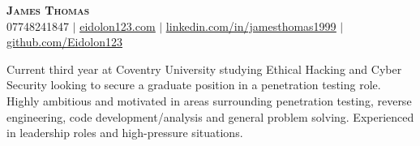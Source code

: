 \documentclass[letterpaper,11pt]{article}
\begin{document}
\linespread{1.3}


\begin{center}
    \textbf{\Huge \scshape James Thomas} \\ \vspace{1pt}
    \small 07748241847 $|$ \href{mailto:x@xcom}{\underline{eidolon123.com}} $|$ 
    \href{https://linkedin.com/in/x}{\underline{linkedin.com/in/jamesthomas1999}} $|$
    \href{https://github.com/x}{\underline{github.com/Eidolon123}}
\end{center}

\hfill \break
Current third year at Coventry University studying Ethical Hacking and Cyber Security looking to secure a graduate position in a penetration testing role.
Highly ambitious and motivated in areas surrounding penetration testing, reverse engineering, code development/analysis and general problem solving. Experienced in leadership roles and high-pressure situations.

\end{document}
